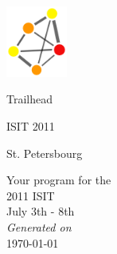 \documentclass[a4,11pt]{report}
\newcommand{\mytitle}[1]{\Large \LARGE #1\par}
\newcommand{\mysubtitle}[1]{\large #1\par}
\newcommand{\mydate}[1]{\small #1\par}
\begin{document}
\begin{center}

\noindent%
\begin{minipage}[t]{.25\textwidth}
\vspace{0pt}\includegraphics[width=2cm]{img/logo/logo.png}
\end{minipage}%
\begin{minipage}[t]{.5\textwidth}
\vspace{16pt}
\vfill
\mytitle{Trailhead}
\mysubtitle{ISIT 2011}
\mydate{St. Petersbourg}
\end{minipage}

\Large
\vfill
Your program for the\\
2011 ISIT\\
July 3th - 8th\\
\vfill
\vfill
\small {\itshape Generated on}\\
\small \today
\end{center}
\thispagestyle{empty}\null\clearpage\setcounter{page}{1}
\end{document}
